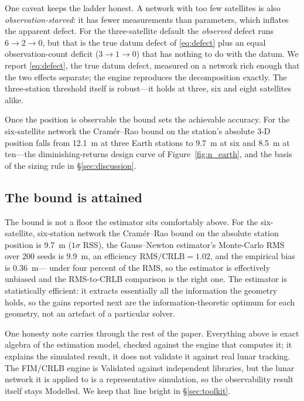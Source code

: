 One caveat keeps the ladder honest. A network with too few satellites is also
\emph{observation-starved}: it has fewer measurements than parameters, which
inflates the apparent defect. For the three-satellite default the \emph{observed}
defect runs $6 \to 2 \to 0$, but that is the true datum defect of \eqref{eq:defect}
plus an equal observation-count deficit ($3 \to 1 \to 0$) that has nothing to do
with the datum. We report \eqref{eq:defect}, the true datum defect, measured on a
network rich enough that the two effects separate; the engine reproduces the
decomposition exactly. The three-station threshold itself is robust---it holds at
three, six and eight satellites alike.

Once the position is observable the bound sets the achievable accuracy. For the
six-satellite network the Cram\'er--Rao bound on the station's absolute 3-D position
falls from \SI{12.1}{\meter} at three Earth stations to \SI{9.7}{\meter} at six and
\SI{8.5}{\meter} at ten---the diminishing-returns design curve of
Figure~\ref{fig:n_earth}, and the basis of the sizing rule in \S\ref{sec:discussion}.

\subsection{The bound is attained}

The bound is not a floor the estimator sits comfortably above. For the
six-satellite, six-station network the Cram\'er--Rao bound on the absolute station
position is \SI{9.7}{\meter} ($1\sigma$ RSS), the Gauss--Newton estimator's
Monte-Carlo RMS over 200 seeds is \SI{9.9}{\meter}, an efficiency
$\text{RMS}/\text{CRLB} = 1.02$, and the empirical bias is \SI{0.36}{\meter}---%
under four percent of the RMS, so the estimator is effectively unbiased and the
RMS-to-CRLB comparison is the right one. The estimator is statistically efficient:
it extracts essentially all the information the geometry holds, so the gains
reported next are the information-theoretic optimum for each geometry, not an
artefact of a particular solver.

One honesty note carries through the rest of the paper. Everything above is exact
algebra of the estimation model, checked against the engine that computes it; it
explains the simulated result, it does not validate it against real lunar tracking.
The FIM/CRLB engine is Validated against independent libraries, but the lunar
network it is applied to is a representative simulation, so the observability result
itself stays Modelled. We keep that line bright in \S\ref{sec:toolkit}.

